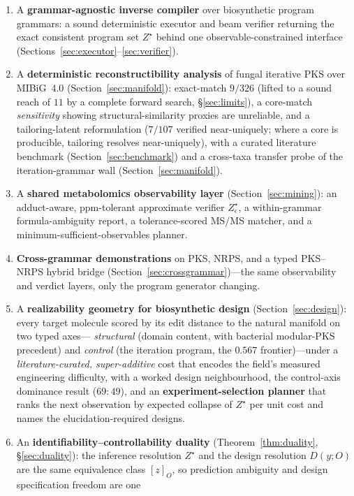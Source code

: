 \documentclass[11pt]{article}
\theoremstyle{definition}
\newcommand{\zstar}{\ensuremath{Z^{\star}}}
\begin{document}
\begin{enumerate}[leftmargin=1.4em,itemsep=2pt]
\item A \textbf{grammar-agnostic inverse compiler} over biosynthetic program grammars: a sound
deterministic executor and beam verifier returning the exact consistent program set \zstar{}
behind one observable-constrained interface (Sections~\ref{sec:executor}--\ref{sec:verifier}).
\item A \textbf{deterministic reconstructibility analysis} of fungal iterative PKS over MIBiG~4.0
(Section~\ref{sec:manifold}): exact-match $9/326$ (lifted to a sound reach of $11$ by a complete forward
search, \S\ref{sec:limits}), a core-match \emph{sensitivity} showing
structural-similarity proxies are unreliable, and a tailoring-latent reformulation ($7/107$ verified
near-uniquely; where a core is producible, tailoring resolves near-uniquely), with a curated literature benchmark
(Section~\ref{sec:benchmark}) and a cross-taxa transfer probe of the iteration-grammar wall
(Section~\ref{sec:manifold}).
\item A \textbf{shared metabolomics observability layer} (Section~\ref{sec:mining}): an
adduct-aware, ppm-tolerant approximate verifier $Z^{\star}_{\epsilon}$, a within-grammar
formula-ambiguity report, a tolerance-scored MS/MS matcher, and a minimum-sufficient-observables
planner.
\item \textbf{Cross-grammar demonstrations} on PKS, NRPS, and a typed PKS--NRPS hybrid bridge
(Section~\ref{sec:crossgrammar})---the same observability and verdict layers, only the program
generator changing.
\item A \textbf{realizability geometry for biosynthetic design} (Section~\ref{sec:design}): every
target molecule scored by its edit distance to the natural manifold on two typed axes---%
\emph{structural} (domain content, with bacterial modular-PKS precedent) and \emph{control} (the
iteration program, the $0.567$ frontier)---under a \emph{literature-curated, super-additive} cost that
encodes the field's measured engineering difficulty, with a worked design neighbourhood, the
control-axis dominance result ($69\!:\!49$), and an \textbf{experiment-selection planner} that ranks
the next observation by expected collapse of $Z^\star$ per unit cost and names the
elucidation-required designs.
\item An \textbf{identifiability--controllability duality} (Theorem~\ref{thm:duality},
\S\ref{sec:duality}): the inference resolution $Z^{\star}$ and the design resolution $D(y;O)$ are the
same equivalence class $[z]_O$, so prediction ambiguity and design specification freedom are one

\end{enumerate}
\end{document}
